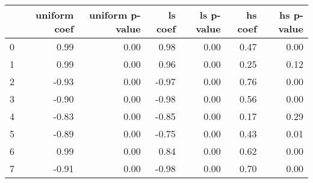 \begin{tabular}{lrrrrrr}
\toprule
 & uniform coef & uniform p-value & ls coef & ls p-value & hs coef & hs p-value \\
\midrule
0 & 0.99 & 0.00 & 0.98 & 0.00 & 0.47 & 0.00 \\
1 & 0.99 & 0.00 & 0.96 & 0.00 & 0.25 & 0.12 \\
2 & -0.93 & 0.00 & -0.97 & 0.00 & 0.76 & 0.00 \\
3 & -0.90 & 0.00 & -0.98 & 0.00 & 0.56 & 0.00 \\
4 & -0.83 & 0.00 & -0.85 & 0.00 & 0.17 & 0.29 \\
5 & -0.89 & 0.00 & -0.75 & 0.00 & 0.43 & 0.01 \\
6 & 0.99 & 0.00 & 0.84 & 0.00 & 0.62 & 0.00 \\
7 & -0.91 & 0.00 & -0.98 & 0.00 & 0.70 & 0.00 \\
\bottomrule
\end{tabular}
